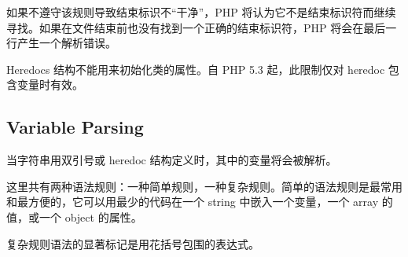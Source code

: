 如果不遵守该规则导致结束标识不“干净”，PHP 将认为它不是结束标识符而继续寻找。如果在文件结束前也没有找到一个正确的结束标识符，PHP 将会在最后一行产生一个解析错误。

Heredocs 结构不能用来初始化类的属性。自 PHP 5.3 起，此限制仅对 heredoc 包含变量时有效。

\subsection{Variable Parsing}

当字符串用双引号或 heredoc 结构定义时，其中的变量将会被解析。

这里共有两种语法规则：一种简单规则，一种复杂规则。简单的语法规则是最常用和最方便的，它可以用最少的代码在一个 string 中嵌入一个变量，一个 array 的值，或一个 object 的属性。

复杂规则语法的显著标记是用花括号包围的表达式。

